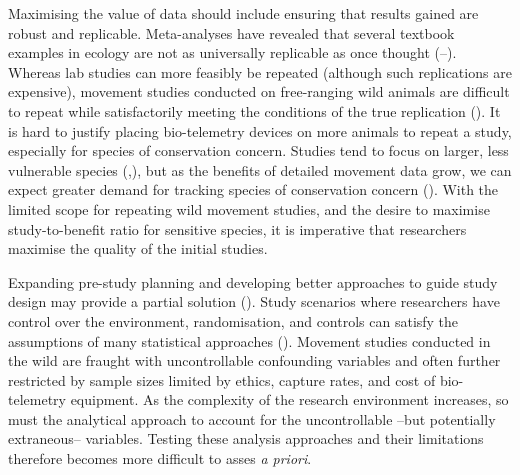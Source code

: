 \documentclass[10pt,a4paper]{article}
\begin{document}
Maximising the value of data should include ensuring that results gained are robust and replicable.
Meta-analyses have revealed that several textbook examples in ecology are not as universally replicable as once thought (--).
Whereas lab studies can more feasibly be repeated (although such replications are expensive), movement studies conducted on free-ranging wild animals are difficult to repeat while satisfactorily meeting the conditions of the true replication ().
It is hard to justify placing bio-telemetry devices on more animals to repeat a study, especially for species of conservation concern.
Studies tend to focus on larger, less vulnerable species (,), but as the benefits of detailed movement data grow, we can expect greater demand for tracking species of conservation concern ().
With the limited scope for repeating wild movement studies, and the desire to maximise study-to-benefit ratio for sensitive species, it is imperative that researchers maximise the quality of the initial studies.

Expanding pre-study planning and developing better approaches to guide study design may provide a partial solution ().
Study scenarios where researchers have control over the environment, randomisation, and controls can satisfy the assumptions of many statistical approaches ().
Movement studies conducted in the wild are fraught with uncontrollable confounding variables and often further restricted by sample sizes limited by ethics, capture rates, and cost of bio-telemetry equipment.
As the complexity of the research environment increases, so must the analytical approach to account for the uncontrollable --but potentially extraneous-- variables.
Testing these analysis approaches and their limitations therefore becomes more difficult to asses \emph{a priori}.
\end{document}

